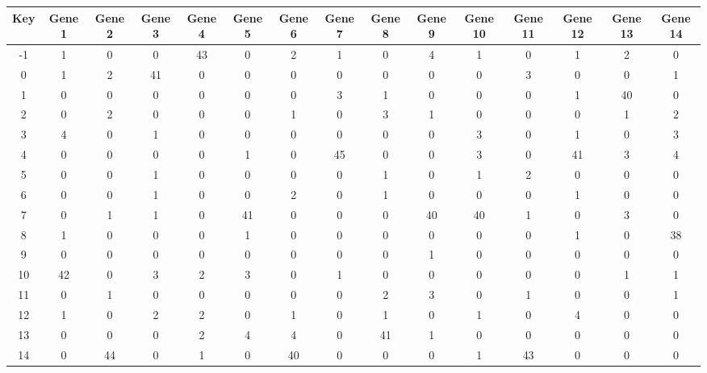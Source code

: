 \begin{tabular}{|c|c|c|c|c|c|c|c|c|c|c|c|c|c|c|}
\hline
Key & Gene 1 & Gene 2 & Gene 3 & Gene 4 & Gene 5 & Gene 6 & Gene 7 & Gene 8 & Gene 9 & Gene 10 & Gene 11 & Gene 12 & Gene 13 & Gene 14 \\
\hline
-1 & 1 & 0 & 0 & 43 & 0 & 2 & 1 & 0 & 4 & 1 & 0 & 1 & 2 & 0 \\
0 & 1 & 2 & 41 & 0 & 0 & 0 & 0 & 0 & 0 & 0 & 3 & 0 & 0 & 1 \\
1 & 0 & 0 & 0 & 0 & 0 & 0 & 3 & 1 & 0 & 0 & 0 & 1 & 40 & 0 \\
2 & 0 & 2 & 0 & 0 & 0 & 1 & 0 & 3 & 1 & 0 & 0 & 0 & 1 & 2 \\
3 & 4 & 0 & 1 & 0 & 0 & 0 & 0 & 0 & 0 & 3 & 0 & 1 & 0 & 3 \\
4 & 0 & 0 & 0 & 0 & 1 & 0 & 45 & 0 & 0 & 3 & 0 & 41 & 3 & 4 \\
5 & 0 & 0 & 1 & 0 & 0 & 0 & 0 & 1 & 0 & 1 & 2 & 0 & 0 & 0 \\
6 & 0 & 0 & 1 & 0 & 0 & 2 & 0 & 1 & 0 & 0 & 0 & 1 & 0 & 0 \\
7 & 0 & 1 & 1 & 0 & 41 & 0 & 0 & 0 & 40 & 40 & 1 & 0 & 3 & 0 \\
8 & 1 & 0 & 0 & 0 & 1 & 0 & 0 & 0 & 0 & 0 & 0 & 1 & 0 & 38 \\
9 & 0 & 0 & 0 & 0 & 0 & 0 & 0 & 0 & 1 & 0 & 0 & 0 & 0 & 0 \\
10 & 42 & 0 & 3 & 2 & 3 & 0 & 1 & 0 & 0 & 0 & 0 & 0 & 1 & 1 \\
11 & 0 & 1 & 0 & 0 & 0 & 0 & 0 & 2 & 3 & 0 & 1 & 0 & 0 & 1 \\
12 & 1 & 0 & 2 & 2 & 0 & 1 & 0 & 1 & 0 & 1 & 0 & 4 & 0 & 0 \\
13 & 0 & 0 & 0 & 2 & 4 & 4 & 0 & 41 & 1 & 0 & 0 & 0 & 0 & 0 \\
14 & 0 & 44 & 0 & 1 & 0 & 40 & 0 & 0 & 0 & 1 & 43 & 0 & 0 & 0 \\
\hline
\end{tabular}